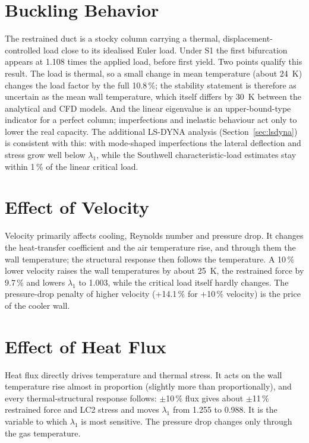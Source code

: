 \section{Buckling Behavior}
The restrained duct is a stocky column carrying a thermal, displacement-controlled load close to its idealised Euler load. Under S1 the first
bifurcation appears at 1.108 times the applied load, before first yield. Two points qualify this result. The load is thermal, so a small
change in mean temperature (about 24~K) changes the load factor by the full 10.8\,\%; the stability statement is therefore as uncertain as the
mean wall temperature, which itself differs by 30~K between the analytical and CFD models. And the linear eigenvalue is an upper-bound-type
indicator for a perfect column; imperfections and inelastic behaviour act only to lower the real capacity. The additional LS-DYNA
analysis (Section~\ref{sec:lsdyna}) is consistent with this: with mode-shaped imperfections the lateral deflection and stress grow well below
$\lambda_1$, while the Southwell characteristic-load estimates stay within 1\,\% of the linear critical load.

\section{Effect of Velocity}
Velocity primarily affects cooling, Reynolds number and pressure drop. It changes the heat-transfer coefficient and the air temperature rise,
and through them the wall temperature; the structural response then follows the temperature. A 10\,\% lower velocity raises the wall
temperatures by about 25~K, the restrained force by 9.7\,\% and lowers $\lambda_1$ to 1.003, while the critical load itself hardly changes. The
pressure-drop penalty of higher velocity (+14.1\,\% for +10\,\% velocity) is the price of the cooler wall.

\section{Effect of Heat Flux}
Heat flux directly drives temperature and thermal stress. It acts on the wall temperature rise almost in proportion (slightly more than
proportionally), and every thermal-structural response follows: $\pm$10\,\% flux gives about $\pm$11\,\% restrained force and LC2 stress and moves
$\lambda_1$ from 1.255 to 0.988. It is the variable to which $\lambda_1$ is most sensitive. The pressure drop changes only through the gas
temperature.

